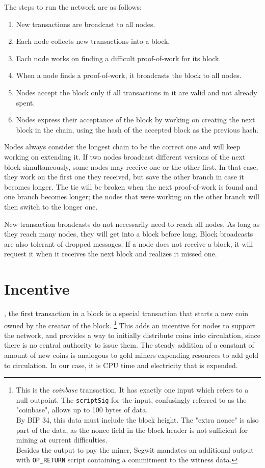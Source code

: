 \documentclass[nohyper]{tufte-handout}
\begin{document}
The steps to run the network are as follows:

\begin{enumerate}[1)]
\item
  New transactions are broadcast to all nodes.
\item
  Each node collects new transactions into a block.
\item
  Each node works on finding a difficult proof-of-work for its block.
\item
  When a node finds a proof-of-work, it broadcasts the block to all
  nodes.
\item
  Nodes accept the block only if all transactions in it are valid and
  not already spent.
\item
  Nodes express their acceptance of the block by working on creating the
  next block in the chain, using the hash of the accepted block as the
  previous hash.
\end{enumerate}

Nodes always consider the longest chain to be the correct one and will keep working on extending it. If two nodes broadcast different versions of the next block simultaneously, some nodes may receive one or the other first. In that case, they work on the first one they received, but save the other branch in case it becomes longer. The tie will be broken when the next proof-of-work is found and one branch becomes longer; the
nodes that were working on the other branch will then switch to the longer one.

New transaction broadcasts do not necessarily need to reach all nodes.
As long as they reach many nodes, they will get into a block before long. Block broadcasts are also tolerant of dropped messages. If a node does not receive a block, it will request it when it receives the next block and realizes it missed one.

\section{Incentive}\label{incentive}

, the first transaction in a block is a special transaction
that starts a new coin owned by the creator of the block.  \footnote{This is the \emph{coinbase} transaction.  It has exactly one input which refers to a null outpoint.  The \texttt{scriptSig} for the input, confusingly referred to as the "coinbase", allows up to 100 bytes of data.\\By BIP 34, this data must include the block height.  The "extra nonce" is also part of the data, as the nonce field in the block header is not sufficient for mining at current difficulties.\\Besides the output to pay the miner, Segwit mandates an additional output with \texttt{OP\_RETURN} script containing a commitment to the witness data. } This adds an
incentive for nodes to support the network, and provides a way to
initially distribute coins into circulation, since there is no central
authority to issue them. The steady addition of a constant of amount of
new coins is analogous to gold miners expending resources to add gold to
circulation. In our case, it is CPU time and electricity that is
expended.
\end{document}
